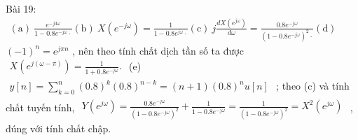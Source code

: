 \documentclass[
  10
]{article}
\begin{document}
Bài 19:
\(\begin{array} { r } { \mathrm { ( a ) } \ \frac { e ^ { - j 3 \omega } } { 1 - 0 . 8 e ^ { - j \omega } \cdot } \mathrm { ( b ) } \ X ( e ^ { - j \omega } ) = \frac { 1 } { 1 - 0 . 8 e ^ { j \omega } \cdot } \mathrm { ( c ) } \ j \frac { d X ( e ^ { j \omega } ) } { d \omega } = \frac { 0 . 8 e ^ { - j \omega } } { ( 1 - 0 . 8 e ^ { - j \omega } ) ^ { 2 } \cdot } \mathrm { ( d ) } } \end{array}\)
\(( - 1 ) ^ { n } = e ^ { j \pi n }\) , nên theo tính chất dịch tần số
ta được
\(\begin{array} { r } { X ( e ^ { j ( \omega - \pi ) } ) = \frac { 1 } { 1 + 0 . 8 e ^ { - j \omega } } . } \end{array}\)
(e)
\(\begin{array} { r } { y [ n ] = \sum _ { k = 0 } ^ { n } ( 0 . 8 ) ^ { k } ( 0 . 8 ) ^ { n - k } = ( n + 1 ) ( 0 . 8 ) ^ { n } u [ n ] } \end{array}\)
; theo (c) và tính chất tuyến tính,
\(\begin{array} { r } { Y ( e ^ { j \omega } ) = \frac { 0 . 8 e ^ { - j \omega } } { ( 1 - 0 . 8 e ^ { - j \omega } ) ^ { 2 } } + \frac { 1 } { 1 - 0 . 8 e ^ { - j \omega } } = \frac { 1 } { ( 1 - 0 . 8 e ^ { - j \omega } ) ^ { 2 } } = X ^ { 2 } ( e ^ { j \omega } ) } \end{array}\)
, đúng với tính chất chập.
\end{document}
